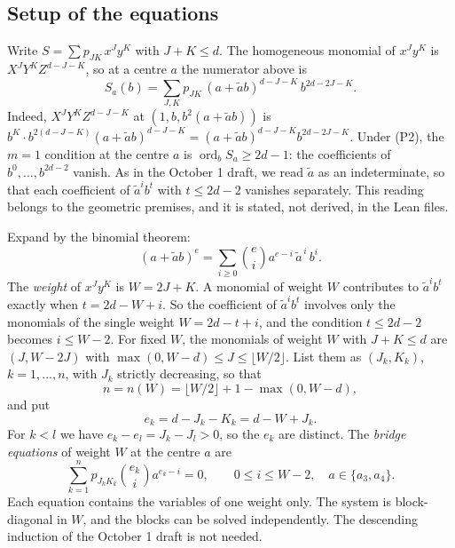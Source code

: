 \documentclass[a4paper,11pt]{article}
\theoremstyle{jsplain}
\theoremstyle{jsdef}
\theoremstyle{jsrem}
\begin{document}
\subsection{Setup of the equations}

Write $S = \sum p_{JK}\, x^J y^K$ with $J + K \leq d$. The homogeneous monomial of $x^J y^K$ is
$X^J Y^K Z^{d-J-K}$, so at a centre $a$ the numerator above is
\begin{equation}\label{td:eq:bridge-pullback}
S_a(b) = \sum_{J,K} p_{JK}\,(a + \tilde{a} b)^{d-J-K}\, b^{2d-2J-K}.
\end{equation}
Indeed, $X^J Y^K Z^{d-J-K}$ at $(1, b, b^2(a+\tilde a b))$ is
$b^K \cdot b^{2(d-J-K)} (a+\tilde a b)^{d-J-K} = (a+\tilde a b)^{d-J-K} b^{2d-2J-K}$. Under (P2),
the $m = 1$ condition at the centre $a$ is $\operatorname{ord}_b S_a \geq 2d - 1$: the coefficients of
$b^0, \dots, b^{2d-2}$ vanish. As in the October 1 draft, we read $\tilde a$ as an indeterminate, so
that each coefficient of $\tilde a^i b^t$ with $t \leq 2d - 2$ vanishes separately. This reading
belongs to the geometric premises, and it is stated, not derived, in the Lean files.

Expand by the binomial theorem:
\[
(a + \tilde{a} b)^{e} = \sum_{i \geq 0} \binom{e}{i} a^{e - i}\, \tilde{a}^{\,i}\, b^i .
\]
The \emph{weight} of $x^J y^K$ is $W = 2J + K$. A monomial of weight $W$ contributes to
$\tilde a^i b^t$ exactly when $t = 2d - W + i$. So the coefficient of $\tilde a^i b^t$ involves only
the monomials of the single weight $W = 2d - t + i$, and the condition $t \leq 2d - 2$ becomes
$i \leq W - 2$. For fixed $W$, the monomials of weight $W$ with $J + K \leq d$ are
$(J, W - 2J)$ with $\max(0, W - d) \leq J \leq \lfloor W/2 \rfloor$. List them as $(J_k, K_k)$,
$k = 1, \dots, n$, with $J_k$ strictly decreasing, so that
\[
n = n(W) = \lfloor W/2 \rfloor + 1 - \max(0, W - d),
\]
and put
\begin{equation}\label{td:eq:ek-def}
e_k = d - J_k - K_k = d - W + J_k .
\end{equation}
For $k < l$ we have $e_k - e_l = J_k - J_l > 0$, so the $e_k$ are distinct. The \emph{bridge
equations} of weight $W$ at the centre $a$ are
\begin{equation}\label{td:eq:block}
\sum_{k=1}^n p_{J_k K_k}\binom{e_k}{i} a^{e_k-i} = 0, \qquad 0 \leq i \leq W - 2, \quad
a \in \{a_3, a_4\}.
\end{equation}
Each equation contains the variables of one weight only. The system is block-diagonal in $W$, and
the blocks can be solved independently. The descending induction of the October 1 draft is not
needed.
\end{document}
